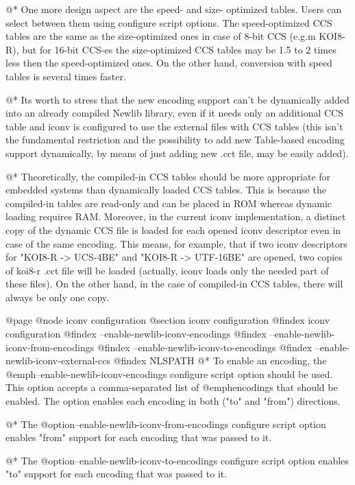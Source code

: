 @*
One more design aspect are the speed- and size- optimized tables. Users can
select between them using configure script options. The
speed-optimized CCS tables are the same as the size-optimized ones in
case of 8-bit CCS (e.g.m KOI8-R), but for 16-bit CCS-es the size-optimized
CCS tables may be 1.5 to 2 times less then the speed-optimized ones. On the
other hand, conversion with speed tables is several times faster.

@*
Its worth to stress that the new encoding support can't be
dynamically added into an already compiled Newlib library, even if it
needs only an additional CCS table and iconv is configured to use
the external files with CCS tables (this isn't the fundamental restriction
and the possibility to add new Table-based encoding support dynamically, by
means of just adding new .cct file, may be easily added).

@*
Theoretically, the compiled-in CCS tables should be more appropriate for
embedded systems than dynamically loaded CCS tables.  This is because the compiled-in tables are read-only and can be placed in ROM
whereas dynamic loading requires RAM.  Moreover, in the current iconv
implementation, a distinct copy of the dynamic CCS file is loaded for each opened iconv descriptor even in case of the same encoding.
This means, for example, that if two iconv descriptors for
"KOI8-R -> UCS-4BE" and "KOI8-R -> UTF-16BE" are opened, two copies of
koi8-r .cct file will be loaded (actually, iconv loads only the needed part
of these files).  On the other hand, in the case of compiled-in CCS tables, there will always be only one copy.

@page
@node iconv configuration
@section iconv configuration
@findex iconv configuration
@findex --enable-newlib-iconv-encodings
@findex --enable-newlib-iconv-from-encodings
@findex --enable-newlib-iconv-to-encodings
@findex --enable-newlib-iconv-external-ccs
@findex NLSPATH
@*
To enable an encoding, the @emph{--enable-newlib-iconv-encodings} configure
script option should be used. This option accepts a comma-separated list
of @emph{encodings} that should be enabled. The option enables each encoding in both
("to" and "from") directions.

@*
The @option{--enable-newlib-iconv-from-encodings} configure script option enables
"from" support for each encoding that was passed to it.

@*
The @option{--enable-newlib-iconv-to-encodings} configure script option enables
"to" support for each encoding that was passed to it.

